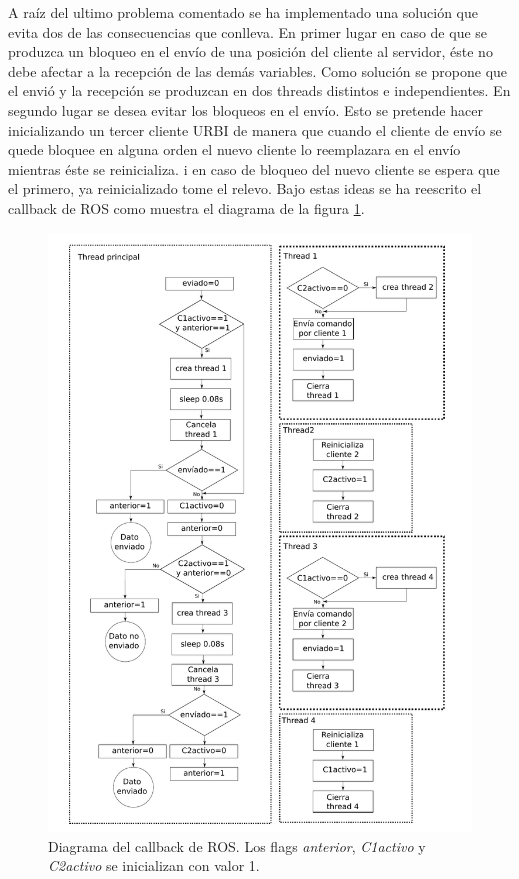 \documentclass[12pt,a4paper,final,twoside]{article}
\begin{document}
A raíz del ultimo problema comentado se ha implementado una solución que evita dos de las consecuencias que conlleva.
En primer lugar en caso de que se produzca un bloqueo en el envío de una posición del cliente al servidor, éste no debe afectar a la recepción de las demás variables. Como solución se propone que el envió y la recepción se produzcan en dos threads distintos e independientes. 
En segundo lugar se desea evitar los bloqueos en el envío. Esto se pretende hacer inicializando un tercer cliente URBI de manera que cuando el cliente de envío se quede bloquee en alguna orden el nuevo cliente lo reemplazara en el envío mientras éste se reinicializa. i en caso de bloqueo del nuevo cliente se espera que el primero, ya reinicializado tome el relevo.
Bajo estas ideas se ha reescrito el callback de ROS como muestra el diagrama de la figura \ref{fig:Call}.

\begin{figure}[H]
	\centering
    \includegraphics[scale=0.75]{images/esquemaCall.pdf}
	 \caption{Diagrama del callback de ROS. Los flags \textit{anterior}, \textit{C1activo} y \textit{C2activo} se inicializan con valor 1.}
  \label{fig:Call}
\end{figure}
\end{document}
